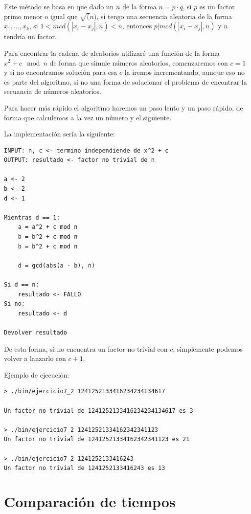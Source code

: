 \documentclass[12pt, spanish]{article}
\begin{document}
Este método se basa en que dado un $n$ de la forma $n = p \cdot q$, si $p$ es un factor primo menor o igual que $\sqrt(n)$, si tengo una secuencia aleatoria de la forma $x_1, ..., x_k$, si $1 < mcd(|x_i - x_j|, n) < n$, entonces $p | mcd(|x_i - x_j|, n)$ y $n$ tendría un factor.

Para encontrar la cadena de aleatorios utilizaré una función de la forma $x^2 + c \mod n$ de forma que simule números aleatorios, comenzaremos con $c = 1$ y si no encontramos solución para esa $c$ la iremos incrementando, aunque eso no es parte del algoritmo, si no una forma de solucionar el problema de encontrar la secuancia de números aleatorios.

Para hacer más rápido el algoritmo haremos un paso lento y un paso rápido, de forma que calculemos a la vez un número y el siguiente.

La implementación sería la siguiente:


\begin{lstlisting}[caption={Algoritmo rho de Pollard}]
INPUT: n, c <- termino independiende de x^2 + c
OUTPUT: resultado <- factor no trivial de n

a <- 2
b <- 2
d <- 1

Mientras d == 1:
	a = a^2 + c mod n
	b = b^2 + c mod n
	b = b^2 + c mod n

	d = gcd(abs(a - b), n)

Si d == n:
	resultado <- FALLO
Si no:
	resultado <- d

Devolver resultado
\end{lstlisting}

De esta forma, si no encuentra un factor no trivial con $c$, simplemente podemos volver a lanzarlo con $c + 1$.

Ejemplo de ejecución:

\begin{lstlisting}
> ./bin/ejercicio7_2 1241252133416234234134617

Un factor no trivial de 1241252133416234234134617 es 3

> ./bin/ejercicio7_2 12412521334162342341123
Un factor no trivial de 12412521334162342341123 es 21

> ./bin/ejercicio7_2 1241252133416243
Un factor no trivial de 1241252133416243 es 13
\end{lstlisting}



\section{Comparación de tiempos}
\end{document}
